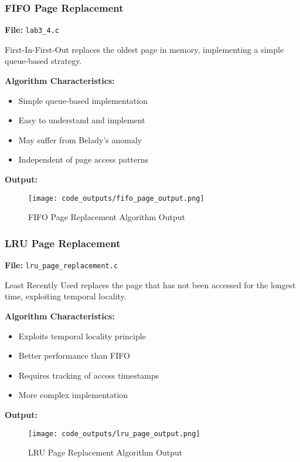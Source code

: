 \documentclass[12pt,a4paper]{article}
\begin{document}
\subsubsection{FIFO Page Replacement}
\textbf{File:} \texttt{lab3\_4.c}

First-In-First-Out replaces the oldest page in memory, implementing a simple queue-based strategy.

\textbf{Algorithm Characteristics:}
\begin{itemize}
    \item Simple queue-based implementation
    \item Easy to understand and implement
    \item May suffer from Belady's anomaly
    \item Independent of page access patterns
\end{itemize}

\textbf{Output:}
\begin{figure}[H]
    \centering
    \texttt{[image: code\_outputs/fifo\_page\_output.png]}
    \caption{FIFO Page Replacement Algorithm Output}
    \label{fig:fifo_page_output}
\end{figure}

\vspace{3cm}

\subsubsection{LRU Page Replacement}
\textbf{File:} \texttt{lru\_page\_replacement.c}

Least Recently Used replaces the page that has not been accessed for the longest time, exploiting temporal locality.

\textbf{Algorithm Characteristics:}
\begin{itemize}
    \item Exploits temporal locality principle
    \item Better performance than FIFO
    \item Requires tracking of access timestamps
    \item More complex implementation
\end{itemize}

\textbf{Output:}
\begin{figure}[H]
    \centering
    \texttt{[image: code\_outputs/lru\_page\_output.png]}
    \caption{LRU Page Replacement Algorithm Output}
    \label{fig:lru_page_output}
\end{figure}
\end{document}
